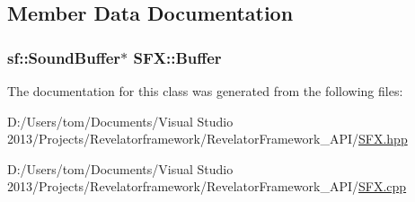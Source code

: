 \subsection{Member Data Documentation}
\hypertarget{class_s_f_x_ae55cbdae082548b85511de868d03a9f2}{
\subsubsection[{Buffer}]{\setlength{\rightskip}{0pt plus 5cm}sf\-::\-Sound\-Buffer$\ast$ S\-F\-X\-::\-Buffer\hspace{0.3cm}{\ttfamily [private]}}}\label{class_s_f_x_ae55cbdae082548b85511de868d03a9f2}


The documentation for this class was generated from the following files\-:\begin{DoxyCompactItemize}
\item 
D\-:/\-Users/tom/\-Documents/\-Visual Studio 2013/\-Projects/\-Revelatorframework/\-Revelator\-Framework\-\_\-\-A\-P\-I/\hyperlink{_s_f_x_8hpp}{S\-F\-X.\-hpp}\item 
D\-:/\-Users/tom/\-Documents/\-Visual Studio 2013/\-Projects/\-Revelatorframework/\-Revelator\-Framework\-\_\-\-A\-P\-I/\hyperlink{_s_f_x_8cpp}{S\-F\-X.\-cpp}\end{DoxyCompactItemize}
